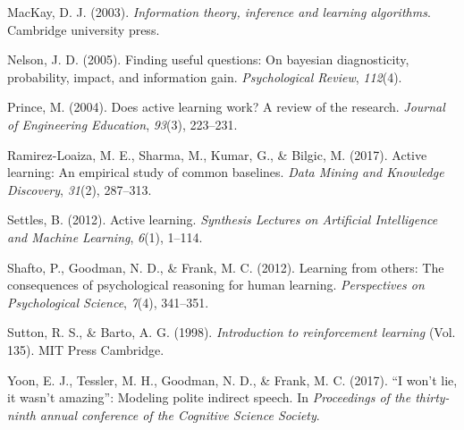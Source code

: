 \documentclass[10pt, letterpaper]{article}
\begin{document}
\hypertarget{ref-mackay2003}{}
MacKay, D. J. (2003). \emph{Information theory, inference and learning
algorithms}. Cambridge university press.

\hypertarget{ref-nelson2005}{}
Nelson, J. D. (2005). Finding useful questions: On bayesian
diagnosticity, probability, impact, and information gain.
\emph{Psychological Review}, \emph{112}(4).

\hypertarget{ref-prince2004does}{}
Prince, M. (2004). Does active learning work? A review of the research.
\emph{Journal of Engineering Education}, \emph{93}(3), 223--231.

\hypertarget{ref-ramirez2017active}{}
Ramirez-Loaiza, M. E., Sharma, M., Kumar, G., \& Bilgic, M. (2017).
Active learning: An empirical study of common baselines. \emph{Data
Mining and Knowledge Discovery}, \emph{31}(2), 287--313.

\hypertarget{ref-settles2012active}{}
Settles, B. (2012). Active learning. \emph{Synthesis Lectures on
Artificial Intelligence and Machine Learning}, \emph{6}(1), 1--114.

\hypertarget{ref-shafto2012learning}{}
Shafto, P., Goodman, N. D., \& Frank, M. C. (2012). Learning from
others: The consequences of psychological reasoning for human learning.
\emph{Perspectives on Psychological Science}, \emph{7}(4), 341--351.

\hypertarget{ref-sutton1998}{}
Sutton, R. S., \& Barto, A. G. (1998). \emph{Introduction to
reinforcement learning} (Vol. 135). MIT Press Cambridge.

\hypertarget{ref-yoon2017}{}
Yoon, E. J., Tessler, M. H., Goodman, N. D., \& Frank, M. C. (2017). ``I
won't lie, it wasn't amazing'': Modeling polite indirect speech. In
\emph{Proceedings of the thirty-ninth annual conference of the Cognitive
Science Society}.
\end{document}

